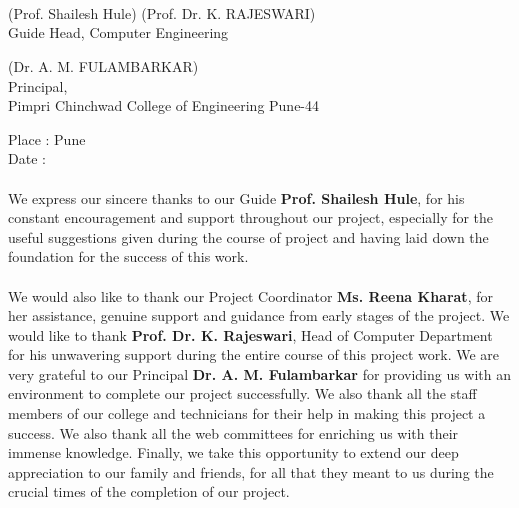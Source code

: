     {
    \\\\\\ (Prof. Shailesh Hule) \hspace{5.5cm} (Prof. Dr. K. RAJESWARI) \\
    \hspace{7.8cm}Guide  \hspace{8.3cm} {Head, Computer Engineering} \\
    }
      \begin{center}
    (Dr. A. M. FULAMBARKAR)\\
    Principal,\\
    Pimpri Chinchwad College of Engineering Pune-44
    \end{center}
    Place : Pune \\
    Date  :


\begin{acknowledgments}

\paragraph{}
We express our sincere thanks to our Guide { \textbf{Prof. Shailesh Hule}}, for his constant encouragement and support throughout our project, especially for the useful suggestions given during the course of project and having laid down the foundation for the success of this work.
\paragraph{}
We would also like to thank our Project Coordinator {\textbf{Ms. Reena Kharat}}, for her assistance, genuine support and guidance from early stages of the project. We would like to thank \textbf{Prof. Dr. K. Rajeswari}, Head of Computer Department for his unwavering support during the entire course of this project work. We are very grateful to our Principal \textbf{Dr. A. M. Fulambarkar} for providing us with an environment to complete our project successfully. We also thank all the staff members of our college and technicians for their help in making this project a success. We also thank all the web committees for enriching us with their immense knowledge. Finally, we take this opportunity to extend our deep appreciation to our family and friends, for all that they meant to us during the crucial times of the completion of our project.\\
\begin{flushright}
\end{flushright}
\end{acknowledgments}



\setcounter{page}{1}
{
\tableofcontents
}


% 
\listoffigures
\listoftables


\cleardoublepage{} %
